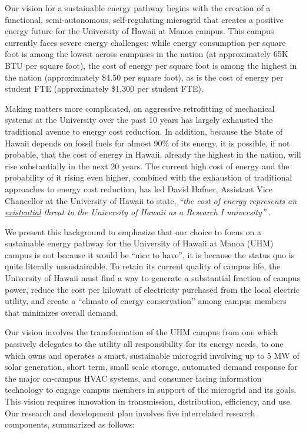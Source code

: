 Our vision for a sustainable energy pathway begins with the creation of a
functional, semi-autonomous, self-regulating microgrid that creates a
positive energy future for the University of Hawaii at Manoa campus. This
campus currently faces severe energy challenges: while energy
consumption per square foot is among the lowest across campuses in the
nation (at approximately 65K BTU per square foot), the cost of energy per
square foot is among the highest in the nation (approximately \$4.50 per
square foot), as is the cost of energy per student FTE (approximately
\$1,300 per student FTE).  

Making matters more complicated, an aggressive retrofitting of mechanical
systems at the University over the past 10 years has largely exhausted the
traditional avenue to energy cost reduction.  In addition, because the
State of Hawaii depends on fossil fuels for almost 90\% of its energy, it
is possible, if not probable, that the cost of energy in Hawaii, already
the highest in the nation, will rise substantially in the next 20
years. The current high cost of energy and the probability of it rising
even higher, combined with the exhaustion of traditional approaches to
energy cost reduction, has led David Hafner, Assistant Vice Chancellor
at the University of Hawaii to state, {\em ``the cost of energy represents
  an \underline{existential} threat to the University of Hawaii as a Research I
  university''} \cite{Hafner2011}.

We present this background to emphasize that our choice to focus on a
sustainable energy pathway for the University of Hawaii at Manoa (UHM) campus is
not because it would be ``nice to have'', it is because the status quo is
quite literally unsustainable.  To retain its current quality of campus
life, the University of Hawaii must find a way to generate a substantial
fraction of campus power, reduce the cost per kilowatt of electricity
purchased from the local electric utility, and create a ``climate of
energy conservation'' among campus members that minimizes overall demand.

Our vision involves the transformation of the UHM campus from one which
passively delegates to the utility all responsibility for its energy needs,
to one which owns and operates a smart, sustainable microgrid involving up
to 5 MW of solar generation, short term, small scale storage, automated
demand response for the major on-campus HVAC systems, and consumer facing
information technology to engage campus members in support of the
microgrid and its goals.  This vision requires innovation in transmission,
distribution, efficiency, and use.  Our research and development plan
involves five interrelated research components, summarized as follows:

